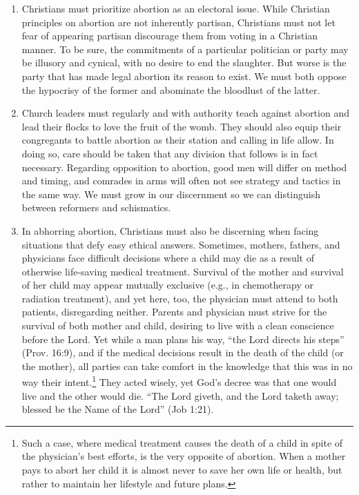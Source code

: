 \documentclass[
]{book}
\begin{document}
\begin{enumerate}
\def\labelenumi{\arabic{enumi}.}
\setcounter{enumi}{15}
\item
  Christians must prioritize abortion as an electoral issue. While Christian principles on abortion are not inherently partisan, Christians must not let fear of appearing partisan discourage them from voting in a Christian manner. To be sure, the commitments of a particular politician or party may be illusory and cynical, with no desire to end the slaughter. But worse is the party that has made legal abortion its reason to exist. We must both oppose the hypocrisy of the former and abominate the bloodlust of the latter.
\item
  Church leaders must regularly and with authority teach against abortion and lead their flocks to love the fruit of the womb. They should also equip their congregants to battle abortion as their station and calling in life allow. In doing so, care should be taken that any division that follows is in fact necessary. Regarding opposition to abortion, good men will differ on method and timing, and comrades in arms will often not see strategy and tactics in the same way. We must grow in our discernment so we can distinguish between reformers and schismatics.
\item
  In abhorring abortion, Christians must also be discerning when facing situations that defy easy ethical answers. Sometimes, mothers, fathers, and physicians face difficult decisions where a child may die as a result of otherwise life-saving medical treatment. Survival of the mother and survival of her child may appear mutually exclusive (e.g., in chemotherapy or radiation treatment), and yet here, too, the physician must attend to both patients, disregarding neither. Parents and physician must strive for the survival of both mother and child, desiring to live with a clean conscience before the Lord. Yet while a man plans his way, ``the Lord directs his steps'' (Prov. 16:9), and if the medical decisions result in the death of the child (or the mother), all parties can take comfort in the knowledge that this was in no way their intent.\footnote{Such a case, where medical treatment causes the death of a child in spite of the physician's best efforts, is the very opposite of abortion. When a mother pays to abort her child it is almost never to save her own life or health, but rather to maintain her lifestyle and future plans.} They acted wisely, yet God's decree was that one would live and the other would die. ``The Lord giveth, and the Lord taketh away; blessed be the Name of the Lord'' (Job 1:21).
\end{enumerate}
\end{document}
